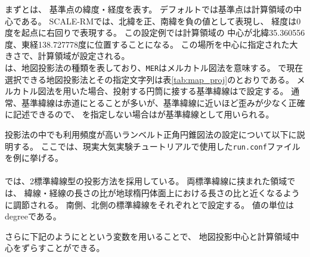 \noindent
まずとは、
基準点の緯度・経度を表す。
デフォルトでは基準点は計算領域の中心である。
SCALE-RMでは、北緯を正、南緯を負の値として表現し、
経度は0度を起点に右回りで表現する。
この設定例では計算領域の
中心が北緯35.360556度、東経138.727778度に位置することになる。
この場所を中心に指定された大きさで、計算領域が設定される。\\
は、地図投影法の種類を表しており、\verb|MER|はメルカトル図法を意味する。
\scalerm で現在選択できる地図投影法とその指定文字列は表\ref{tab:map_proj}のとおりである。
メルカトル図法を用いた場合、投射する円筒に接する基準緯線はで設定する。
通常、基準緯線は赤道にとることが多いが、基準緯線に近いほど歪みが少なく正確に記述できるので、
を指定しない場合はが基準緯線として用いられる。

投影法の中でも利用頻度が高いランベルト正角円錐図法の設定について以下に説明する。
ここでは、現実大気実験チュートリアルで使用した\verb|run.conf|ファイルを例に挙げる。\\

{\small {\gt
{}}}\\

\noindent
\scalerm では、2標準緯線型の投影方法を採用している。
両標準緯線に挟まれた領域では、
緯線・経線の長さの比が地球楕円体面上における長さの比と近くなるように調節される。
南側、北側の標準緯線をそれぞれとで設定する。
値の単位はdegreeである。

さらに下記のようにとという変数を用いることで、
地図投影中心と計算領域中心をずらすことができる。\\~\\


